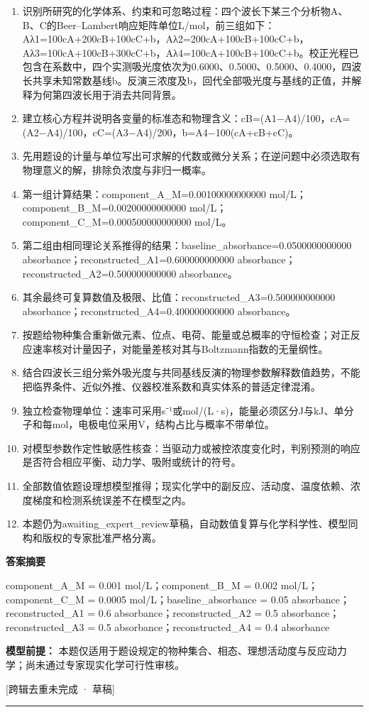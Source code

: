 \documentclass[UTF8,11pt,a4paper]{ctexart}
\begin{document}
\begin{enumerate}
\item 识别所研究的化学体系、约束和可忽略过程：四个波长下某三个分析物A、B、C的Beer–Lambert响应矩阵单位L/mol，前三组如下：Aλ1=100cA+200cB+100cC+b，Aλ2=200cA+100cB+100cC+b，Aλ3=100cA+100cB+300cC+b，Aλ4=100cA+100cB+100cC+b。校正光程已包含在系数中，四个实测吸光度依次为0.6000、0.5000、0.5000、0.4000，四波长共享未知常数基线b。反演三浓度及b，回代全部吸光度与基线的正值，并解释为何第四波长用于消去共同背景。
\item 建立核心方程并说明各变量的标准态和物理含义：cB=(A1−A4)/100，cA=(A2−A4)/100，cC=(A3−A4)/200，b=A4−100(cA+cB+cC)。
\item 先用题设的计量与单位写出可求解的代数或微分关系；在逆问题中必须选取有物理意义的解，排除负浓度与非归一概率。
\item 第一组计算结果：component\_A\_M=0.00100000000000 mol/L；component\_B\_M=0.00200000000000 mol/L；component\_C\_M=0.000500000000000 mol/L。
\item 第二组由相同理论关系推得的结果：baseline\_absorbance=0.0500000000000 absorbance；reconstructed\_A1=0.600000000000 absorbance；reconstructed\_A2=0.500000000000 absorbance。
\item 其余最终可复算数值及极限、比值：reconstructed\_A3=0.500000000000 absorbance；reconstructed\_A4=0.400000000000 absorbance。
\item 按题给物种集合重新做元素、位点、电荷、能量或总概率的守恒检查；对正反应速率核对计量因子，对能量差核对其与Boltzmann指数的无量纲性。
\item 结合四波长三组分紫外吸光度与共同基线反演的物理参数解释数值趋势，不能把临界条件、近似外推、仪器校准系数和真实体系的普适定律混淆。
\item 独立检查物理单位：速率可采用s⁻¹或mol/(L·s)，能量必须区分J与kJ、单分子和每mol，电极电位采用V，结构占比与概率不带单位。
\item 对模型参数作定性敏感性核查：当驱动力或被控浓度变化时，判别预测的响应是否符合相应平衡、动力学、吸附或统计的符号。
\item 全部数值依题设理想模型推得；现实化学中的副反应、活动度、温度依赖、浓度梯度和检测系统误差不在模型之内。
\item 本题仍为awaiting\_expert\_review草稿，自动数值复算与化学科学性、模型同构和版权的专家批准严格分离。
\end{enumerate}
\noindent\textbf{答案摘要}\par
component\_A\_M = 0.001 mol/L；component\_B\_M = 0.002 mol/L；component\_C\_M = 0.0005 mol/L；baseline\_absorbance = 0.05 absorbance；reconstructed\_A1 = 0.6 absorbance；reconstructed\_A2 = 0.5 absorbance；reconstructed\_A3 = 0.5 absorbance；reconstructed\_A4 = 0.4 absorbance\par
\noindent\textbf{模型前提：}
本题仅适用于题设规定的物种集合、相态、理想活动度与反应动力学；尚未通过专家现实化学可行性审核。\par
\noindent\textcolor{red!65!black}{[跨辑去重未完成 · 草稿]} \par
\medskip\hrule\medskip
{}
\end{document}
